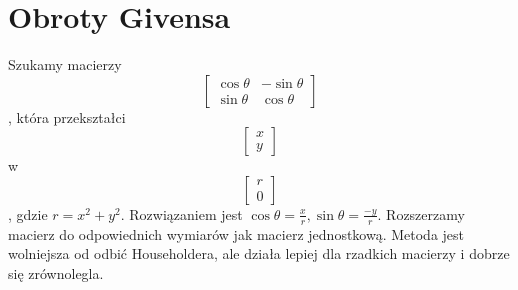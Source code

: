 \section{Obroty Givensa}
Szukamy macierzy
\[
	\begin{bmatrix}
		\cos \theta & -\sin \theta \\
		\sin \theta & \cos \theta
	\end{bmatrix} \],
która przekształci
\[
	\begin{bmatrix}
		x \\
		y
	\end{bmatrix} \]
w
\[ \begin{bmatrix}
		r \\
		0
	\end{bmatrix} \]
\(\!\!\), gdzie \( r = x^2 + y^2 \). Rozwiązaniem jest \( \cos \theta = \frac{x}{r}, \sin \theta = \frac{-y}{r} \). Rozszerzamy macierz do odpowiednich wymiarów jak macierz jednostkową. Metoda jest wolniejsza od odbić Householdera, ale działa lepiej dla rzadkich macierzy i dobrze się zrównolegla.
